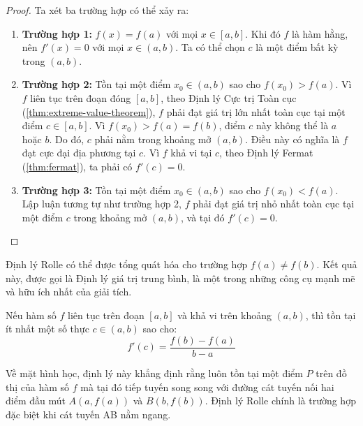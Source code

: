 

\begin{proof}
Ta xét ba trường hợp có thể xảy ra:
\begin{enumerate}[label=(\alph*)]
    \item \textbf{Trường hợp 1:} $f(x) = f(a)$ với mọi $x \in [a,b]$. Khi đó $f$ là hàm hằng, nên $f'(x) = 0$ với mọi $x \in (a,b)$. Ta có thể chọn $c$ là một điểm bất kỳ trong $(a,b)$.
    \item \textbf{Trường hợp 2:} Tồn tại một điểm $x_0 \in (a,b)$ sao cho $f(x_0) > f(a)$. Vì $f$ liên tục trên đoạn đóng $[a,b]$, theo Định lý Cực trị Toàn cục (\ref{thm:extreme-value-theorem}), $f$ phải đạt giá trị lớn nhất toàn cục tại một điểm $c \in [a,b]$. Vì $f(x_0) > f(a) = f(b)$, điểm $c$ này không thể là $a$ hoặc $b$. Do đó, $c$ phải nằm trong khoảng mở $(a,b)$. Điều này có nghĩa là $f$ đạt cực đại địa phương tại $c$. Vì $f$ khả vi tại $c$, theo Định lý Fermat (\ref{thm:fermat}), ta phải có $f'(c)=0$.
    \item \textbf{Trường hợp 3:} Tồn tại một điểm $x_0 \in (a,b)$ sao cho $f(x_0) < f(a)$. Lập luận tương tự như trường hợp 2, $f$ phải đạt giá trị nhỏ nhất toàn cục tại một điểm $c$ trong khoảng mở $(a,b)$, và tại đó $f'(c)=0$.
\end{enumerate}
\end{proof}

Định lý Rolle có thể được tổng quát hóa cho trường hợp $f(a) \neq f(b)$. Kết quả này, được gọi là Định lý giá trị trung bình, là một trong những công cụ mạnh mẽ và hữu ích nhất của giải tích.

\begin{theorem}\label{thm:mean-value-theorem}
Nếu hàm số $f$ liên tục trên đoạn $[a, b]$ và khả vi trên khoảng $(a, b)$, thì tồn tại ít nhất một số thực $c \in (a, b)$ sao cho:
$$ f'(c) = \dfrac{f(b) - f(a)}{b - a} $$
\end{theorem}



Về mặt hình học, định lý này khẳng định rằng luôn tồn tại một điểm $P$ trên đồ thị của hàm số $f$ mà tại đó tiếp tuyến song song với đường cát tuyến nối hai điểm đầu mút $A(a, f(a))$ và $B(b, f(b))$. Định lý Rolle chính là trường hợp đặc biệt khi cát tuyến AB nằm ngang.

